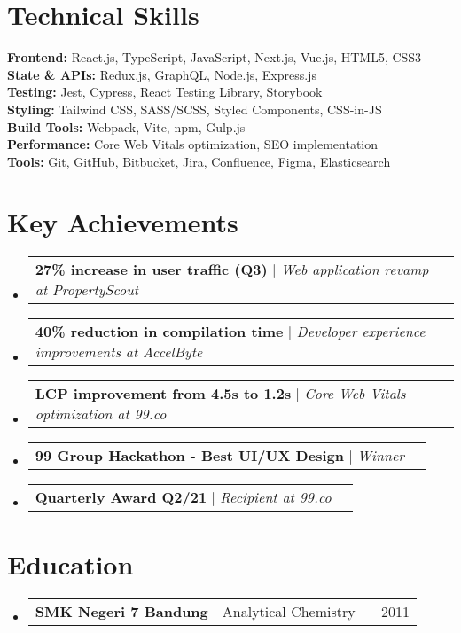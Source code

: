 \documentclass[a4paper, 11pt]{article}
\makeatletter
\newcommand{\resumeSubheading}[4]{
  \vspace{-2pt}\item
    \begin{tabularx}{0.987\textwidth}[t]{
  >{\raggedright\arraybackslash}X
  >{\centering\arraybackslash}X
  >{\raggedleft\arraybackslash}X }
      \textbf{#1} & #2 & #3 \\
    \end{tabularx}
    \textit{\small#4}\\
    \vspace{-7pt}
}
\newcommand{\resumeProjectHeading}[2]{
    \item
    \begin{tabular*}{0.987\textwidth}{l@{\extracolsep{\fill}}r}
      \small#1\\
    \end{tabular*}\vspace{-7pt}
}
\newcommand{\resumeSubHeadingListStart}{\begin{itemize}[leftmargin=0.1in, label={}]}
\newcommand{\resumeSubHeadingListEnd}{\end{itemize}\vspace{5pt}}
\makeatother
\begin{document}
\section{Technical Skills}
  \resumeSubHeadingListStart
    \small{\item{
      \textbf{Frontend:}{ React.js, TypeScript, JavaScript, Next.js, Vue.js, HTML5, CSS3} \\
      \textbf{State \& APIs:}{ Redux.js, GraphQL, Node.js, Express.js} \\
      \textbf{Testing:}{ Jest, Cypress, React Testing Library, Storybook} \\
      \textbf{Styling:}{ Tailwind CSS, SASS/SCSS, Styled Components, CSS-in-JS} \\
      \textbf{Build Tools:}{ Webpack, Vite, npm, Gulp.js} \\
      \textbf{Performance:}{ Core Web Vitals optimization, SEO implementation} \\
      \textbf{Tools:}{ Git, GitHub, Bitbucket, Jira, Confluence, Figma, Elasticsearch}
    }}
  \resumeSubHeadingListEnd

\section{Key Achievements}
    \resumeSubHeadingListStart
        \resumeProjectHeading
            {\textbf{27\% increase in user traffic (Q3)} $|$ \emph{Web application revamp at PropertyScout}}{2023}
        \resumeProjectHeading
            {\textbf{40\% reduction in compilation time} $|$ \emph{Developer experience improvements at AccelByte}}{2022}
        \resumeProjectHeading
            {\textbf{LCP improvement from 4.5s to 1.2s} $|$ \emph{Core Web Vitals optimization at 99.co}}{2021}
        \resumeProjectHeading
            {\textbf{99 Group Hackathon - Best UI/UX Design} $|$ \emph{Winner}}{2021}
        \resumeProjectHeading
            {\textbf{Quarterly Award Q2/21} $|$ \emph{Recipient at 99.co}}{2021}
    \resumeSubHeadingListEnd

\section{Education}
    \resumeSubHeadingListStart
        \resumeSubheading
            {SMK Negeri 7 Bandung}{Analytical Chemistry}{2009 -- 2011}{}
    \resumeSubHeadingListEnd
\end{document}
